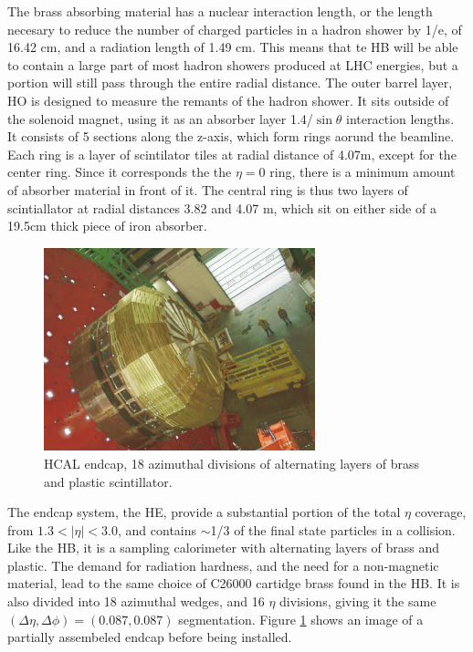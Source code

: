 \par  The brass absorbing material has a nuclear interaction length,
or the length necesary to reduce the number of charged particles in a
hadron shower by 1/e, of 16.42 cm, and a radiation length of 1.49 cm.
This means that te HB will be able to contain a large part of most
hadron showers produced at LHC energies, but a portion will still pass
through the entire radial distance.  The outer barrel layer, HO is
designed to measure the remants of the hadron shower.  It sits outside
of the solenoid magnet, using it as an absorber layer
1.4/$\sin{\theta}$ interaction lengths.  It consists of 5 sections
along the z-axis, which form rings aorund the beamline.  Each ring is
a layer of scintilator tiles at radial distance of 4.07m, except for
the center ring.  Since it corresponds the the $\eta=0$ ring, there is
a minimum amount of absorber material in front of it.  The central
ring is thus two layers of scintiallator at radial distances 3.82 and
4.07 m, which sit on either side of a 19.5cm thick piece of iron
absorber.  

\begin{figure}[h]
   \centering
  \includegraphics[width=0.7\textwidth]{Figures/CMS_Diagrams/HCAL__Endcap.pdf}
  \caption{HCAL endcap, 18 azimuthal divisions of alternating layers
    of brass and plastic scintillator.} \label{fig:hcal_endcap}
\end{figure}

\par The endcap system, the HE, provide a substantial portion of the total
$\eta$ coverage, from $1.3<|\eta|<3.0$, and contains $\sim$1/3 of the
final state particles in a collision.  Like the HB, it is a sampling
calorimeter with alternating layers of brass and plastic.  The demand
for radiation hardness, and the need for a non-magnetic material, lead
to the same choice of C26000 cartidge brass found in the HB.  It is
also divided into 18 azimuthal wedges, and 16 $\eta$ divisions, giving
it the same $(\Delta\eta, \Delta\phi) = (0.087, 0.087)$ segmentation.
Figure \ref{fig:hcal_endcap} shows an image of a partially assembeled
endcap before being installed.

